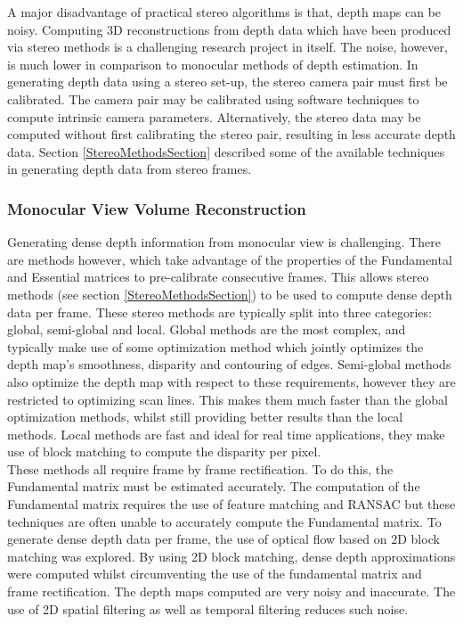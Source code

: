 A major disadvantage of practical stereo algorithms is that, depth maps can be noisy. Computing 3D reconstructions from depth data which have been produced via stereo methods is a challenging research project in itself. The noise, however, is much lower in comparison to monocular methods of depth estimation. In generating depth data using a stereo set-up, the stereo camera pair must first be calibrated. The camera pair may be calibrated using software techniques to compute intrinsic camera parameters. Alternatively, the stereo data may be computed without first calibrating the stereo pair, resulting in less accurate depth data. Section \ref{StereoMethodsSection} described some of the available techniques in generating depth data from stereo frames. \\

\subsubsection{Monocular View Volume Reconstruction}
\label{subsec:MVVRMethodology}

Generating dense depth information from monocular view is challenging. There are methods however, which take advantage of the properties of the Fundamental and Essential matrices to pre-calibrate consecutive frames. This allows stereo methods (see section \ref{StereoMethodsSection}) to be used to compute dense depth data per frame. These stereo methods are typically split into three categories: global, semi-global and local. Global methods are the most complex, and typically make use of some optimization method which jointly optimizes the depth map's smoothness, disparity and contouring of edges. Semi-global methods also optimize the depth map with respect to these requirements, however they are restricted to optimizing scan lines. This makes them much faster than the global optimization methods, whilst still providing better results than the local methods. Local methods are fast and ideal for real time applications, they make use of block matching to compute the disparity per pixel. \\

These methods all require frame by frame rectification. To do this, the Fundamental matrix must be estimated accurately. The computation of the Fundamental matrix requires the use of feature matching and RANSAC but these techniques are often unable to accurately compute the Fundamental matrix. To generate dense depth data per frame, the use of optical flow based on 2D block matching was explored. By using 2D block matching, dense depth approximations were computed whilst circumventing the use of the fundamental matrix and frame rectification. The depth maps computed are very noisy and inaccurate. The use of 2D spatial filtering as well as temporal filtering reduces such noise. \\

